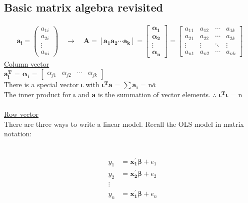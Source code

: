 \subsection{Basic matrix algebra revisited}
\begin{eqnarray*}
\boldsymbol{a_{i}}=\left( \begin{array}{c}
a_{1i}\\
a_{2i}\\
\vdots\\
a_{ni} \end{array} \right) \quad\to\quad\boldsymbol{A}=[\boldsymbol{a_{1} a_{2}}\cdots \boldsymbol{a_{k}}] = \begin{bmatrix}
  \boldsymbol{\alpha_{1}} \\
  \boldsymbol{\alpha_{2}}\\
  \vdots\\
  \boldsymbol{\alpha_{n}}
\end{bmatrix} = \begin{bmatrix}
  a_{11} & a_{12} & \cdots & a_{1k} \\
  a_{21} & a_{22} & \cdots & a_{2k} \\
  \vdots & \vdots & \ddots & \vdots \\
  a_{n1} & a_{n2} & \cdots & a_{nk}
\end{bmatrix}
\end{eqnarray*}
\underline{Column vector}\\
$\boldsymbol{a^{T}_{i}}$ = $\boldsymbol{\alpha_{i}}$ = $\begin{bmatrix} \alpha_{j1} & \alpha_{j2} & \cdots & \alpha_{jk} \end{bmatrix}$\\
There is a special vector $\boldsymbol{\iota}$ with $\boldsymbol{\iota^{T}a}$ = $\sum \boldsymbol{a_{i}}$ = n$\overline{a}$ \\
The inner product for $\boldsymbol{\iota}$ and $\boldsymbol{a}$ is the summation of vector elements. $\therefore$ $\boldsymbol{\iota^{T}\iota}$ = n\\
\\
\underline{Row vector}\\
There are three ways to write a linear model. Recall the OLS model in matrix notation:\\
\\
\begin{eqnarray*}
&y_{1}& = \boldsymbol{x_{1}^{'}\beta} + e_{1}\\
&y_{2}& = \boldsymbol{x_{2}^{'}\beta} + e_{2}\\
&\vdots&\\
&y_{n}& = \boldsymbol{x_{1}^{'}\beta} + e_{n}
\end{eqnarray*}
